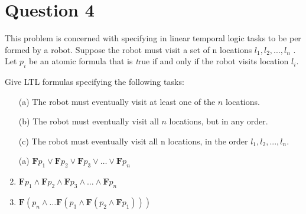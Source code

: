 \documentclass[12pt]{article}
\begin{document}
\vfil
\clearpage








\section{Question 4}
This problem is concerned with specifying in linear temporal logic tasks to be per
formed by a robot. Suppose the robot must visit a set of n locations $l_1, l_2, ..., l_n$ .
Let $p_i$ be an atomic formula that is \textit{t}rue if and only if the robot visits location $l_i$.

Give LTL formulas specifying the following tasks:

\begin{enumerate}
	\item[(a)] The robot must eventually visit at least one of the $n$ locations.
	\item[(b)] The robot must eventually visit all $n$ locations, but in any order.
	\item[(c)] The robot must eventually visit all n locations, in the order $l_1, l_2,..., l_n$.
\end{enumerate}

\begin{qsolve}
	\begin{enumerate}
		\item[(a)] 
		$\mathbf{F}p_1 \lor \mathbf{F}p_2 \lor \mathbf{F}p_3 \lor \ldots \lor \mathbf{F}p_n$
		
		\item 
		$\mathbf{F}p_1 \land \mathbf{F}p_2 \land \mathbf{F}p_3 \land \ldots \land \mathbf{F}p_n$
		
		\item 
		$\mathbf{F}(p_n \land \ldots \mathbf{F}(p_3 \land \mathbf{F}(p_2 \land \mathbf{F}p_1)))$
	\end{enumerate}
\end{qsolve}

\vfil







\vspace*{\fill}
\begin{center}
	\makeendpage

\end{center}
\vfill %
\clearpage
\end{document}
